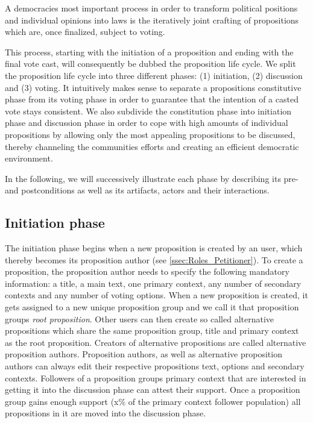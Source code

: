 A democracies most important process in order to transform political positions and individual opinions into laws is the iteratively joint crafting of propositions which are, once finalized, subject to voting.

This process, starting with the initiation of a proposition and ending with the final vote cast, will consequently be dubbed the proposition life cycle.
We split the proposition life cycle into three different phases: (1) initiation, (2) discussion and (3) voting.
It intuitively makes sense to separate a propositions constitutive phase from its voting phase in order to guarantee that the intention of a casted vote stays consistent.
We also subdivide the constitution phase into initiation phase and discussion phase in order to cope with high amounts of individual propositions by allowing only the most appealing propositions to be discussed, thereby channeling the communities efforts and creating an efficient democratic environment.

In the following, we will successively illustrate each phase by describing its pre- and postconditions as well as its artifacts, actors and their interactions.

\subsection{Initiation phase}
\label{ssec:Lifecycle_Initiation}

The initiation phase begins when a new proposition is created by an user, which thereby becomes its proposition author (see \ref{ssec:Roles_Petitioner}).
To create a proposition, the proposition author needs to specify the following mandatory information: a title, a main text, one primary context, any number of secondary contexts and any number of voting options.
When a new proposition is created, it gets assigned to a new unique proposition group and we call it that proposition groups \emph{root proposition}.
Other users can then create so called alternative propositions which share the same proposition group, title and primary context as the root proposition.
Creators of alternative propositions are called alternative proposition authors.
Proposition authors, as well as alternative proposition authors can always edit their respective propositions text, options and secondary contexts.
Followers of a proposition groups primary context that are interested in getting it into the discussion phase can attest their support.
Once a proposition group gains enough support (x\% of the primary context follower population) all propositions in it are moved into the discussion phase.

